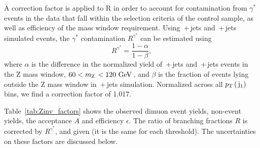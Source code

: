 A correction factor is applied to R in order to account for contamination from $\gamma^{*}$ events in the data that fall within the selection criteria of the control sample, as well as efficiency of the mass window requirement. 
Using \zmumubr\,+\,jets and \znunubr\,+\,jets simulated events, 
the $\gamma^{*}$ contamination $R^{\gamma^{*}}$ can be estimated using
   \begin{equation}
   R^{\gamma^{*}} = \frac{1-\alpha}{1-\beta} ,
   \end{equation}
where $\alpha$ is the difference in the normalized yield of \zmumubr\,+\,jets and \znunubr\,+\,jets events in the Z mass window, $60< m_{\mathrm{Z}\,{}} < 120~\mathrm{GeV}\,$, and
   $\beta$ is the fraction of events lying outside the Z mass window in \znunubr\,+\,jets simulation.
Normalized across all $p_{\text{T}}\,(\,\mathrm{j}_1)$ bins, we find a correction factor of 1.017.


Table~\ref{tab:Zinv_factors} shows the observed dimuon event yields, non-\zmumubr event yields, the acceptance $A$ and efficiency $\epsilon$. The ratio of branching fractions $R$ is corrected by $R^{\gamma^{*}}$, and given (it is the same for each threshold). 
The uncertainties on these factors are discussed below. 



